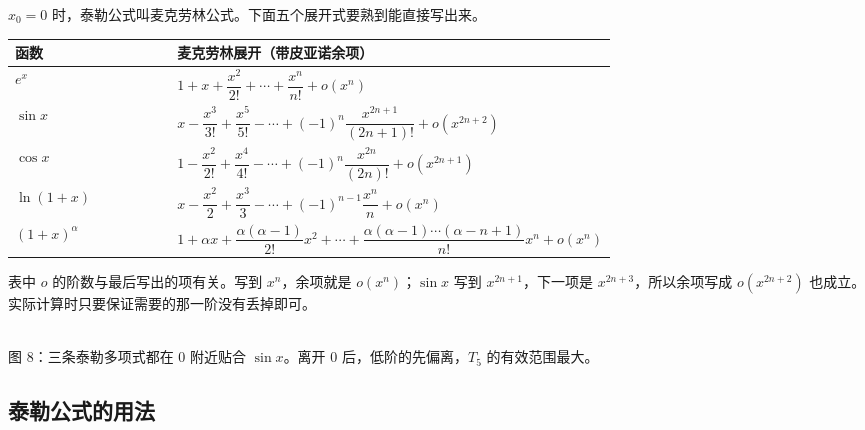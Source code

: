 $x_0=0$ 时，泰勒公式叫麦克劳林公式。下面五个展开式要熟到能直接写出来。

\begin{center}
\footnotesize
\renewcommand{\arraystretch}{1.5}
\begin{tabular}{@{}l p{0.70\linewidth}@{}}
\toprule
函数 & 麦克劳林展开（带皮亚诺余项）\\
\midrule
$e^x$ & $1+x+\dfrac{x^2}{2!}+\cdots+\dfrac{x^n}{n!}+o(x^n)$\\[2pt]
$\sin x$ & $x-\dfrac{x^3}{3!}+\dfrac{x^5}{5!}-\cdots+(-1)^n\dfrac{x^{2n+1}}{(2n+1)!}+o(x^{2n+2})$\\[2pt]
$\cos x$ & $1-\dfrac{x^2}{2!}+\dfrac{x^4}{4!}-\cdots+(-1)^n\dfrac{x^{2n}}{(2n)!}+o(x^{2n+1})$\\[2pt]
$\ln(1+x)$ & $x-\dfrac{x^2}{2}+\dfrac{x^3}{3}-\cdots+(-1)^{n-1}\dfrac{x^n}{n}+o(x^n)$\\[2pt]
$(1+x)^\alpha$ & $1+\alpha x+\dfrac{\alpha(\alpha-1)}{2!}x^2+\cdots+\dfrac{\alpha(\alpha-1)\cdots(\alpha-n+1)}{n!}x^n+o(x^n)$\\
\bottomrule
\end{tabular}
\end{center}

表中 $o$ 的阶数与最后写出的项有关。写到 $x^n$，余项就是 $o(x^n)$；$\sin x$ 写到 $x^{2n+1}$，下一项是 $x^{2n+3}$，所以余项写成 $o(x^{2n+2})$ 也成立。实际计算时只要保证需要的那一阶没有丢掉即可。

\begin{center}
\\[2pt]
{\footnotesize 图 8：三条泰勒多项式都在 $0$ 附近贴合 $\sin x$。离开 $0$ 后，低阶的先偏离，$T_5$ 的有效范围最大。}
\end{center}

\subsection{泰勒公式的用法}

